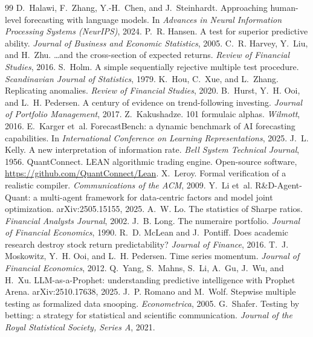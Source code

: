 \documentclass[11pt]{article}
\begin{document}
\begin{thebibliography}{99}
 D.~Halawi, F.~Zhang, Y.-H.~Chen, and J.~Steinhardt. Approaching human-level forecasting with language models. In \emph{Advances in Neural Information Processing Systems (NeurIPS)}, 2024.
 P.~R. Hansen. A test for superior predictive ability. \emph{Journal of Business and Economic Statistics}, 2005.
 C.~R. Harvey, Y.~Liu, and H.~Zhu. \ldots and the cross-section of expected returns. \emph{Review of Financial Studies}, 2016.
 S.~Holm. A simple sequentially rejective multiple test procedure. \emph{Scandinavian Journal of Statistics}, 1979.
 K.~Hou, C.~Xue, and L.~Zhang. Replicating anomalies. \emph{Review of Financial Studies}, 2020.
 B.~Hurst, Y.~H. Ooi, and L.~H. Pedersen. A century of evidence on trend-following investing. \emph{Journal of Portfolio Management}, 2017.
 Z.~Kakushadze. 101 formulaic alphas. \emph{Wilmott}, 2016.
 E.~Karger et~al. ForecastBench: a dynamic benchmark of AI forecasting capabilities. In \emph{International Conference on Learning Representations}, 2025.
 J.~L. Kelly. A new interpretation of information rate. \emph{Bell System Technical Journal}, 1956.
 QuantConnect. LEAN algorithmic trading engine. Open-source software, \url{https://github.com/QuantConnect/Lean}.
 X.~Leroy. Formal verification of a realistic compiler. \emph{Communications of the ACM}, 2009.
 Y.~Li et~al. R\&D-Agent-Quant: a multi-agent framework for data-centric factors and model joint optimization. arXiv:2505.15155, 2025.
 A.~W. Lo. The statistics of Sharpe ratios. \emph{Financial Analysts Journal}, 2002.
 J.~B. Long. The numeraire portfolio. \emph{Journal of Financial Economics}, 1990.
 R.~D. McLean and J.~Pontiff. Does academic research destroy stock return predictability? \emph{Journal of Finance}, 2016.
 T.~J. Moskowitz, Y.~H. Ooi, and L.~H. Pedersen. Time series momentum. \emph{Journal of Financial Economics}, 2012.
 Q.~Yang, S.~Mahns, S.~Li, A.~Gu, J.~Wu, and H.~Xu. LLM-as-a-Prophet: understanding predictive intelligence with Prophet Arena. arXiv:2510.17638, 2025.
 J.~P. Romano and M.~Wolf. Stepwise multiple testing as formalized data snooping. \emph{Econometrica}, 2005.
 G.~Shafer. Testing by betting: a strategy for statistical and scientific communication. \emph{Journal of the Royal Statistical Society, Series A}, 2021.

\end{thebibliography}
\end{document}
